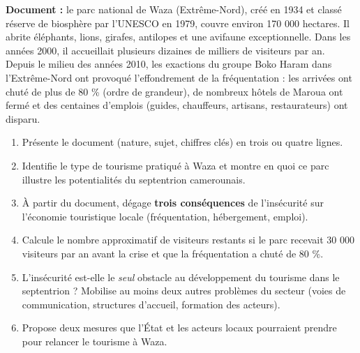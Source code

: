 \documentclass[11pt]{article}
\begin{document}
\begin{exercice}
\textbf{Document :} le parc national de Waza (Extrême-Nord), créé en 1934 et classé réserve de biosphère par l'UNESCO en 1979, couvre environ 170 000 hectares. Il abrite éléphants, lions, girafes, antilopes et une avifaune exceptionnelle. Dans les années 2000, il accueillait plusieurs dizaines de milliers de visiteurs par an. Depuis le milieu des années 2010, les exactions du groupe Boko Haram dans l'Extrême-Nord ont provoqué l'effondrement de la fréquentation : les arrivées ont chuté de plus de 80 \% (ordre de grandeur), de nombreux hôtels de Maroua ont fermé et des centaines d'emplois (guides, chauffeurs, artisans, restaurateurs) ont disparu.

\begin{enumerate}
\item Présente le document (nature, sujet, chiffres clés) en trois ou quatre lignes.
\item Identifie le type de tourisme pratiqué à Waza et montre en quoi ce parc illustre les potentialités du septentrion camerounais.
\item À partir du document, dégage \textbf{trois conséquences} de l'insécurité sur l'économie touristique locale (fréquentation, hébergement, emploi).
\item Calcule le nombre approximatif de visiteurs restants si le parc recevait 30 000 visiteurs par an avant la crise et que la fréquentation a chuté de 80 \%.
\item L'insécurité est-elle le \emph{seul} obstacle au développement du tourisme dans le septentrion ? Mobilise au moins deux autres problèmes du secteur (voies de communication, structures d'accueil, formation des acteurs).
\item Propose deux mesures que l'État et les acteurs locaux pourraient prendre pour relancer le tourisme à Waza.
\end{enumerate}
\end{exercice}
\end{document}
